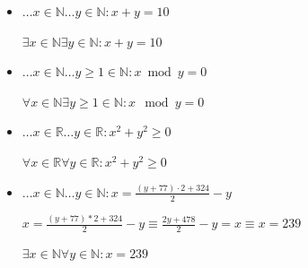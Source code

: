 \documentclass[12pt]{article}
\begin{document}
\begin{enumerate}
\begin{itemize}
    $\exists x \in \mathbb{N}: x > 10$
    
    \item \(\dots x \in \mathbb{N} \dots y \in \mathbb{N} : x + y = 10\)

    $\exists x \in \mathbb{N} \exists y \in \mathbb{N}: x + y = 10$
    \item \(\dots x \in \mathbb{N} \dots y \geq 1 \in \mathbb{N} : x \bmod y = 0\)

    $\forall x \in \mathbb{N} \exists y \geq 1 \in \mathbb{N}: x \mod y = 0$
    
    \item \(\dots x \in \mathbb{R} \dots y \in \mathbb{R} : x^2 + y^2 \geq 0\)

    $\forall x \in \mathbb{R} \forall y \in \mathbb{R}: x^2 + y^2 \geq 0$
    
    \item \(\dots x \in \mathbb{N} \dots y \in \mathbb{N} : x = \frac{(y + 77) \cdot 2 + 324}{2} - y\)

    $x = \frac{(y+77)*2+324}{2} - y \equiv \frac{2y + 478}{2}-y = x \equiv x = 239$

    $\exists x \in \mathbb{N} \forall y \in \mathbb{N}: x = 239$
    
\end{itemize}

\end{enumerate}
\end{document}
